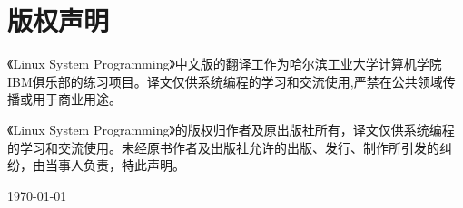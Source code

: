 \chapter{版权声明}
《Linux System Programming》中文版的翻译工作为哈尔滨工业大学计算机学院IBM俱乐部的练习项目。译文仅供系统编程的学习和交流使用,严禁在公共领域传播或用于商业用途。

《Linux System Programming》的版权归作者及原出版社所有，译文仅供系统编程的学习和交流使用。未经原书作者及出版社允许的出版、发行、制作所引发的纠纷，由当事人负责，特此声明。

\begin{flushright}
\today
\end{flushright}

